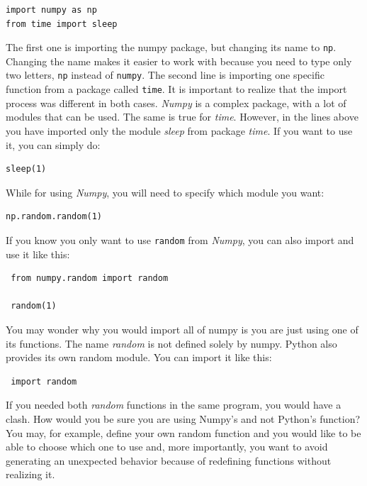 \begin{verbatim}
import numpy as np
from time import sleep
\end{verbatim}

The first one is importing the numpy package, but changing its name to \texttt{np}. Changing the name makes it easier to work with because you need to type only two letters, \texttt{np} instead of \texttt{numpy}. The second line is importing one specific function from a package called \texttt{time}. It is important to realize that the import process was different in both cases. \emph{Numpy} is a complex package, with a lot of modules that can be used. The same is true for \emph{time}. However, in the lines above you have imported only the module \emph{sleep} from package \emph{time}. If you want to use it, you can simply do:

\begin{verbatim}
sleep(1)
\end{verbatim}

While for using \emph{Numpy}, you will need to specify which module you want:

\begin{verbatim}
np.random.random(1)
\end{verbatim}

If you know you only want to use \texttt{random} from \emph{Numpy}, you can also import and use it like this:

\begin{verbatim}
 from numpy.random import random
 
 random(1)
\end{verbatim}

You may wonder why you would import all of numpy is you are just using one of its functions. The name \emph{random} is not defined solely by numpy. Python also provides its own random module. You can import it like this:

\begin{verbatim}
 import random
\end{verbatim}

If you needed both \emph{random} functions in the same program, you would have a clash. How would you be sure you are using Numpy's and not Python's function? You may, for example, define your own random function and you would like to be able to choose which one to use and, more importantly, you want to avoid generating an unexpected behavior because of redefining functions without realizing it. 

